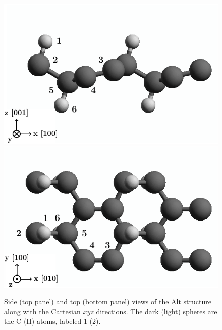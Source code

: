 \documentclass[prb,11pt,tightenlines,twocolumn,aps]{revtex4-1}
\begin{document}
\begin{figure}[ht!]
    \centering
    \includegraphics[width=\linewidth]{figures/altstruc2}
    \\
    \includegraphics[width=\linewidth]{figures/altstruc1}
    \caption{Side (top panel) and top (bottom panel) views of the Alt
      structure along with the 
      Cartesian $xyz$ directions. The dark (light) spheres are the C (H) atoms,
      labeled 1 (2).
}
    \label{fig:alt-struc}
\end{figure}
\end{document}
